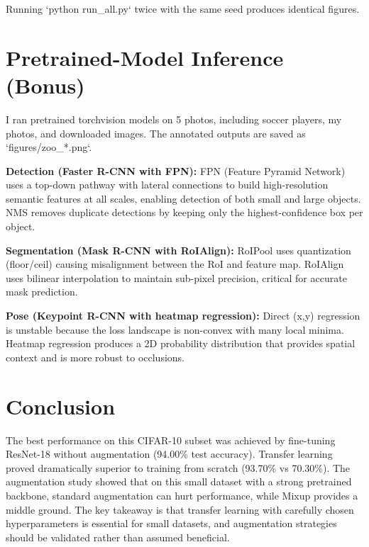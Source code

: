 \documentclass[10pt,twocolumn,letterpaper]{article}
\begin{document}
Running `python run\_all.py` twice with the same seed produces identical figures.

\section{Pretrained-Model Inference (Bonus)}

I ran pretrained torchvision models on 5 photos, including soccer players, my photos, and downloaded images. The annotated outputs are saved as
`figures/zoo\_*.png`.

\textbf{Detection (Faster R-CNN with FPN):}
FPN (Feature Pyramid Network) uses a top-down pathway with lateral connections
to build high-resolution semantic features at all scales, enabling detection of
both small and large objects. NMS removes duplicate detections by keeping only
the highest-confidence box per object.

\textbf{Segmentation (Mask R-CNN with RoIAlign):}
RoIPool uses quantization (floor/ceil) causing misalignment between the RoI and
feature map. RoIAlign uses bilinear interpolation to maintain sub-pixel
precision, critical for accurate mask prediction.

\textbf{Pose (Keypoint R-CNN with heatmap regression):}
Direct (x,y) regression is unstable because the loss landscape is non-convex
with many local minima. Heatmap regression produces a 2D probability
distribution that provides spatial context and is more robust to occlusions.

\section{Conclusion}

The best performance on this CIFAR-10 subset was achieved by fine-tuning
ResNet-18 without augmentation (94.00\% test accuracy). Transfer learning
proved dramatically superior to training from scratch (93.70\% vs 70.30\%).
The augmentation study showed that on this small dataset with a strong
pretrained backbone, standard augmentation can hurt performance, while Mixup
provides a middle ground. The key takeaway is that transfer learning with
carefully chosen hyperparameters is essential for small datasets, and
augmentation strategies should be validated rather than assumed beneficial.

\end{document}
